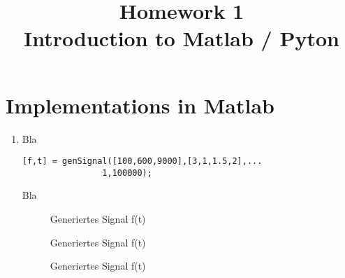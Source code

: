 \documentclass[conference]{IEEEtran}
\begin{document}
%
%
\title{Homework 1\\ Introduction to Matlab / Pyton}

\author{
}


\maketitle

\IEEEpeerreviewmaketitle

\section{Implementations in Matlab}

\begin{enumerate}
\item Bla

\begin{lstlisting}
[f,t] = genSignal([100,600,9000],[3,1,1.5,2],...
				1,100000);
\end{lstlisting}
Bla
\begin{figure}[h!]
  	\centering
    \scalebox{.5}{}
    \caption{Generiertes Signal f(t)}
    \label{fig:forwardEuler}
\end{figure}
\begin{figure}[h!]
  	\centering
    \scalebox{.5}{}
    \caption{Generiertes Signal f(t)}
    \label{fig:heun}
\end{figure}
\begin{figure}[h!]
  	\centering
    \scalebox{.5}{}
    \caption{Generiertes Signal f(t)}
    \label{fig:expEuler}
\end{figure}
\end{enumerate}
\end{document}
